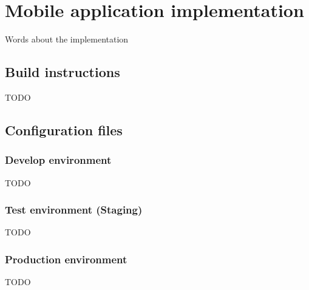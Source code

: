 \chapter{Mobile application implementation}\label{ch:mobile-application-implementation}

Words about the implementation

\section{Build instructions}\label{sec:build-instructions}
TODO

\section{Configuration files}\label{sec:configuration-files}

\subsection{Develop environment}\label{subsec:develop-environment}
TODO

\subsection{Test environment (Staging)}\label{subsec:test-environment}
TODO

\subsection{Production environment}\label{subsec:production-environment}
TODO
